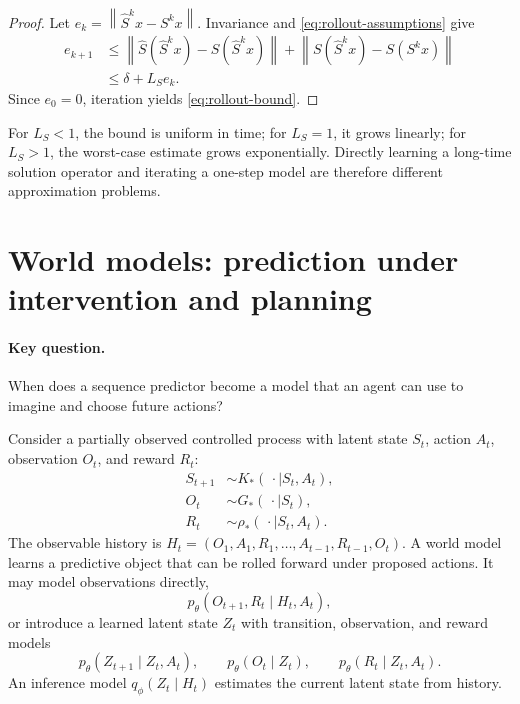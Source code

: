 \documentclass[11pt]{amsart}
\numberwithin{equation}{section}
\theoremstyle{definition}
\theoremstyle{plain}
\theoremstyle{remark}
\newcommand{\norm}[1]{\left\lVert#1\right\rVert}
\begin{document}
\begin{proof}
Let $e_k=\norm{\widehat S^kx-S^kx}$.  Invariance and
\eqref{eq:rollout-assumptions} give
\[
\begin{aligned}
 e_{k+1}
 &\le
 \norm{\widehat S(\widehat S^kx)-S(\widehat S^kx)}
 +\norm{S(\widehat S^kx)-S(S^kx)}\\
 &\le\delta+L_Se_k.
\end{aligned}
\]
Since $e_0=0$, iteration yields \eqref{eq:rollout-bound}.
\end{proof}

For $L_S<1$, the bound is uniform in time; for $L_S=1$, it grows linearly;
for $L_S>1$, the worst-case estimate grows exponentially.  Directly learning a
long-time solution operator and iterating a one-step model are therefore
different approximation problems.


\section{World models: prediction under intervention and planning}
\label{sec:world-models}

\paragraph{\textbf{Key question.}}
When does a sequence predictor become a model that an agent can use to imagine
and choose future actions?

Consider a partially observed controlled process with latent state $S_t$,
action $A_t$, observation $O_t$, and reward $R_t$:
\begin{equation}\label{eq:pomdp-law}
\begin{aligned}
 S_{t+1}&\sim K_*(\,\cdot\mid S_t,A_t),\\
 O_t&\sim G_*(\,\cdot\mid S_t),\\
 R_t&\sim \rho_*(\,\cdot\mid S_t,A_t).
\end{aligned}
\end{equation}
The observable history is
$H_t=(O_1,A_1,R_1,\ldots,A_{t-1},R_{t-1},O_t)$.  A world model learns a
predictive object that can be rolled forward under proposed actions.  It may
model observations directly,
\begin{equation}\label{eq:observable-world-model}
 p_\theta(O_{t+1},R_t\mid H_t,A_t),
\end{equation}
or introduce a learned latent state $Z_t$ with transition, observation, and
reward models
\begin{equation}\label{eq:latent-world-model}
 p_\theta(Z_{t+1}\mid Z_t,A_t),
 \qquad
 p_\theta(O_t\mid Z_t),
 \qquad
 p_\theta(R_t\mid Z_t,A_t).
\end{equation}
An inference model $q_\phi(Z_t\mid H_t)$ estimates the current latent state
from history.
\end{document}
